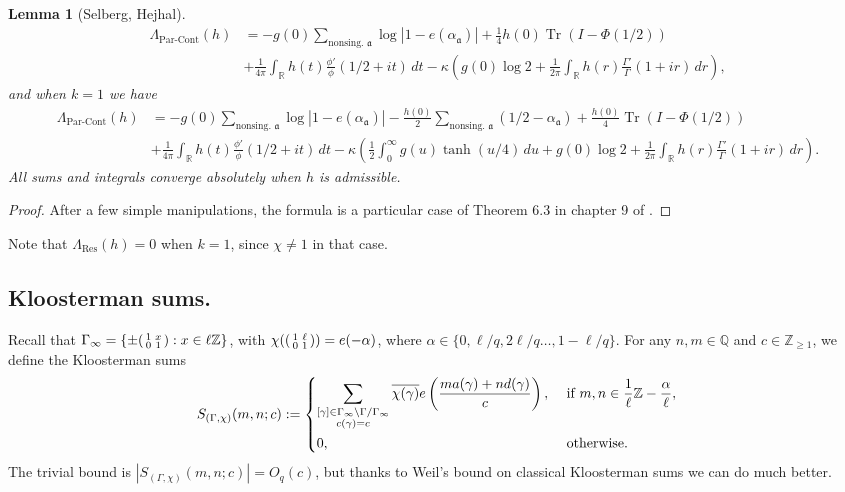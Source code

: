 \documentclass{article}
\newtheorem{lem}[thm]{Lemma}
\theoremstyle{named}
\newcommand{\Z}{\mathbb{Z}}
\newcommand{\Q}{\mathbb{Q}}
\newcommand{\R}{\mathbb{R}}
\renewcommand{\a}{\mathfrak{a}}
\DeclareMathOperator{\Tr}{Tr}
\begin{document}
\begin{lem}[Selberg, Hejhal]
\begin{equation*}
\begin{aligned}
    \Lambda_\text{Par-Cont}(h) & = -g(0) \sum_{\text{nonsing. } \a}\log|1 - e(\alpha_\a)|  + \frac{1}{4}h(0) \Tr(I - \Phi(1/2))\\
    & + \frac{1}{4\pi}\int_\R h(t) \frac{\phi'}{\phi}(1/2 + it)\, dt -\kappa\left( g(0) \log 2  + \frac{1}{2\pi}\int_\R h(r) \frac{\Gamma'}{\Gamma}(1 + ir)\, dr\right),
\end{aligned}
\end{equation*}
and when $k = 1$ we have  
\begin{equation*}
\begin{aligned}
    \Lambda_\text{Par-Cont}(h) & = -g(0) \sum_{\text{nonsing. } \a}\log|1 - e(\alpha_\a)| - \frac{h(0)}{2}\sum_{\text{nonsing. }\a}(1/2 - \alpha_\a) + \frac{h(0)}{4}\Tr(I - \Phi(1/2))\\
    & + \frac{1}{4\pi}\int_\R h(t) \frac{\phi'}{\phi}(1/2 + it) \, dt - \kappa\left(\frac{1}{2}\int_0^\infty g(u)\tanh(u/4)\, du + g(0)\log 2 + \frac{1}{2\pi}\int_\R h(r) \frac{\Gamma'}{\Gamma}(1 + ir)\, dr\right).
\end{aligned}
\end{equation*}
All sums and integrals converge absolutely when $h$ is admissible.
\end{lem}
\begin{proof}
After a few simple manipulations, the formula is a particular case of Theorem 6.3 in chapter 9 of \cite{hejhal2}.
\end{proof}
Note that $\Lambda_{\text{Res}}(h) = 0$ when $k = 1$, since $\chi \neq 1$ in that case.



\subsection{Kloosterman sums.}
Recall that $\Gamma_\infty = \{\pm \begin{psmallmatrix}
    1 & x\\
    0 & 1 \end{psmallmatrix}: x \in \ell\Z\}$, with $\chi(\begin{psmallmatrix}1 & \ell\\
        0 & 1
    \end{psmallmatrix}) = e(-\alpha)$, where $\alpha \in \{0, \ell/q, 2\ell/q \ldots, 1 - \ell/q\}$. For any $n,m \in \Q$ and $c \in \Z_{\geq 1}$, we define the Kloosterman sums
    \begin{equation}\label{eq:generalkloostermansum}
        S_{(\Gamma, \chi)}(m, n; c) := \begin{dcases}
        \sum_{\substack{[\gamma] \in \Gamma_\infty \backslash \Gamma/\Gamma_\infty\\
        c(\gamma) = c}}\overline{\chi(\gamma)}e\left(\frac{m a(\gamma) + n d(\gamma)}{c}\right), & \text{ if }m, n \in \frac{1}{\ell}\Z - \frac{\alpha}{\ell},\\
        0, & \text{ otherwise.}
        \end{dcases}
    \end{equation}
The trivial bound is $|S_{(\Gamma, \chi)}(m, n; c)| = O_q(c)$, but thanks to Weil's bound on classical Kloosterman sums we can do much better. 
\end{document}
